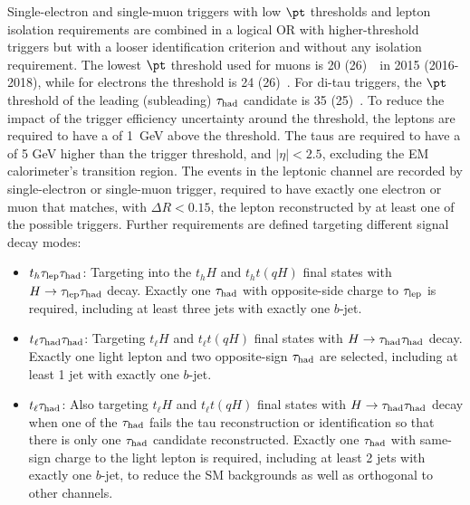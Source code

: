 Single-electron and single-muon triggers with low $\pt$ thresholds and lepton isolation requirements are combined in a logical OR 
with higher-threshold triggers but with a looser identification criterion and without any isolation requirement.
The lowest $\pt$ threshold used for muons is 20 (26)~\gev\ in 2015 (2016-2018), while for electrons the threshold is 24 (26)~\gev.
For di-tau triggers, the $\pt$ threshold of the leading (subleading) $\tau_{\mathrm{had}}$ candidate is 35 (25)~\gev.
To reduce the impact of the trigger efficiency uncertainty around the threshold, the leptons are required to have a \pt of 1~GeV above the threshold. 
The taus are required to have a \pt of 5 GeV higher than the trigger threshold, and $|\eta|<2.5$, excluding the EM calorimeter's transition region.
The events in the leptonic channel are recorded by single-electron or single-muon trigger, required to have exactly one electron or muon that matches, with $\Delta R < 0.15$, the lepton reconstructed by at least one of the possible triggers. Further requirements are defined targeting different signal decay modes:  
\begin{itemize}
\item $t_h\tau_{\mathrm{lep}} \tau_{\mathrm{had}}$: Targeting into the $t_hH$ and $t_ht(qH)$ final states with $H\to\tau_{\mathrm{lep}} \tau_{\mathrm{had}}$ decay. Exactly one $\tau_{\mathrm{had}}$ with opposite-side charge to $\tau_{\mathrm{lep}}$ is required, including at least three jets with exactly one $b$-jet.
\item $t_{\ell}\tau_{\mathrm{had}} \tau_{\mathrm{had}}$: Targeting $t_{\ell}H$ and $t_{\ell}t(qH)$ final states with $H\to\tau_{\mathrm{had}} \tau_{\mathrm{had}}$ decay. Exactly one light lepton and two opposite-sign $\tau_{\mathrm{had}}$ are selected, including at least 1 jet with exactly one $b$-jet.
\item $t_{\ell}\tau_{\mathrm{had}}$: Also targeting $t_{\ell}H$ and $t_{\ell}t(qH)$ final states with $H\to\tau_{\mathrm{had}} \tau_{\mathrm{had}}$ decay when one of the $\tau_{\mathrm{had}}$ fails the tau reconstruction or identification so that there is only
  one $\tau_{\mathrm{had}}$ candidate reconstructed. Exactly one $\tau_{\mathrm{had}}$ with same-sign charge to the light lepton is required, including at least 2 jets with exactly one $b$-jet, to
  reduce the SM backgrounds as well as orthogonal to other channels.
\end{itemize}

